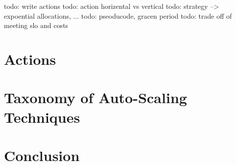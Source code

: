 todo: write actions
todo: action horizental vs vertical
todo: strategy --> expoential allocations, ...
todo: pseoducode, gracen period
todo: trade off of meeting slo and costs

\section{Actions}
\label{ias:actions}

\section{Taxonomy of Auto-Scaling Techniques}
\label{ias:taxonomy}

\section{Conclusion}
\label{ias:conc}